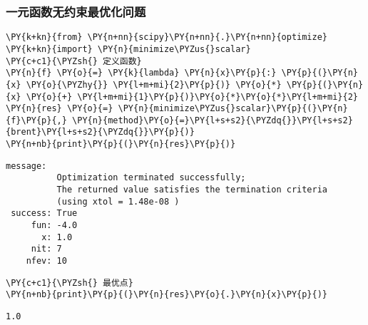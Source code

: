     \hypertarget{ux4e00ux5143ux51fdux6570ux65e0ux7ea6ux675fux6700ux4f18ux5316ux95eeux9898}{%
\subsubsection{一元函数无约束最优化问题}\label{ux4e00ux5143ux51fdux6570ux65e0ux7ea6ux675fux6700ux4f18ux5316ux95eeux9898}}

    \begin{tcolorbox}[breakable, size=fbox, boxrule=1pt, pad at break*=1mm,colback=cellbackground, colframe=cellborder]
\begin{Verbatim}[commandchars=\\\{\}]
\PY{k+kn}{from} \PY{n+nn}{scipy}\PY{n+nn}{.}\PY{n+nn}{optimize} \PY{k+kn}{import} \PY{n}{minimize\PYZus{}scalar}
\PY{c+c1}{\PYZsh{} 定义函数}
\PY{n}{f} \PY{o}{=} \PY{k}{lambda} \PY{n}{x}\PY{p}{:} \PY{p}{(}\PY{n}{x} \PY{o}{\PYZhy{}} \PY{l+m+mi}{2}\PY{p}{)} \PY{o}{*} \PY{p}{(}\PY{n}{x} \PY{o}{+} \PY{l+m+mi}{1}\PY{p}{)}\PY{o}{*}\PY{o}{*}\PY{l+m+mi}{2}
\PY{n}{res} \PY{o}{=} \PY{n}{minimize\PYZus{}scalar}\PY{p}{(}\PY{n}{f}\PY{p}{,} \PY{n}{method}\PY{o}{=}\PY{l+s+s2}{\PYZdq{}}\PY{l+s+s2}{brent}\PY{l+s+s2}{\PYZdq{}}\PY{p}{)}
\PY{n+nb}{print}\PY{p}{(}\PY{n}{res}\PY{p}{)}
\end{Verbatim}
\end{tcolorbox}

    \begin{Verbatim}[commandchars=\\\{\}]
 message:
          Optimization terminated successfully;
          The returned value satisfies the termination criteria
          (using xtol = 1.48e-08 )
 success: True
     fun: -4.0
       x: 1.0
     nit: 7
    nfev: 10
    \end{Verbatim}

    \begin{tcolorbox}[breakable, size=fbox, boxrule=1pt, pad at break*=1mm,colback=cellbackground, colframe=cellborder]
\begin{Verbatim}[commandchars=\\\{\}]
\PY{c+c1}{\PYZsh{} 最优点}
\PY{n+nb}{print}\PY{p}{(}\PY{n}{res}\PY{o}{.}\PY{n}{x}\PY{p}{)}
\end{Verbatim}
\end{tcolorbox}

    \begin{Verbatim}[commandchars=\\\{\}]
1.0
    \end{Verbatim}
